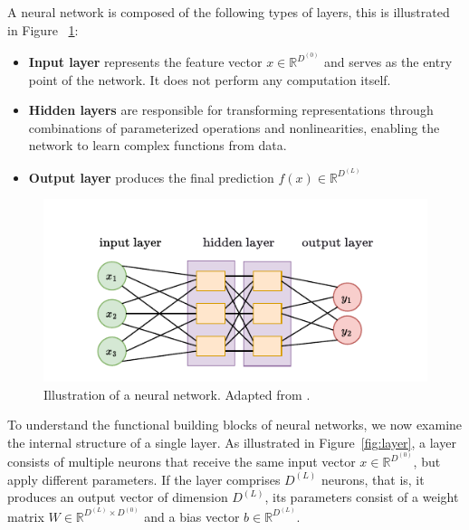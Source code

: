 
A neural network is composed of the following types of layers, this is illustrated in Figure ~\ref{fig:IlNN}:
\begin{itemize}
   \item \textbf{Input layer} represents the feature vector \( x \in \mathbb{R}^{D^{(0)}} \) and serves as the entry point of the network. It does not perform any computation itself.
    \item \textbf{Hidden layers} are responsible for transforming representations through combinations of parameterized operations and nonlinearities, enabling the network to learn complex functions from data. 
    \item \textbf{Output layer} produces the final prediction $f(x) \in \mathbb{R}^{D^{(L)}}$
\end{itemize}


\begin{figure}[h]
    \centering
    \includegraphics[width=0.7\linewidth]{Abschlussarbeit/Pictures/NN_mathematischausgerichtet.pdf}
    \caption{Illustration of a neural network. Adapted from \cite{zhou_machine_2021}.}
    \label{fig:IlNN}
\end{figure}

To understand the functional building blocks of neural networks, we now examine the internal structure of a single layer.
As illustrated in Figure~\ref{fig:layer}, a layer consists of multiple neurons that receive the same input vector \( x \in \mathbb{R}^{D^{(0)}} \), but apply different parameters.
If the layer comprises \( D^{(L)} \) neurons, that is, it produces an output vector of dimension \( D^{(L)} \), its parameters consist of a weight matrix \( W \in \mathbb{R}^{D^{(L)} \times D^{(0)}} \) and a bias vector \( b \in \mathbb{R}^{D^{(L)}} \).

